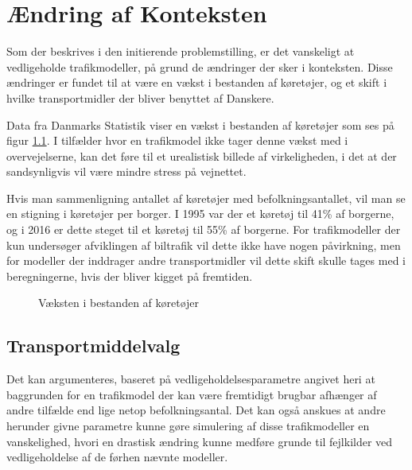 \chapter{Ændring af Konteksten}
Som der beskrives i den initierende problemstilling, er det vanskeligt at vedligeholde trafikmodeller, på grund de ændringer der sker i konteksten. Disse ændringer er fundet til at være en vækst i bestanden af køretøjer, og et skift i hvilke transportmidler der bliver benyttet af Danskere.

\vspace{5mm}

Data fra Danmarks Statistik viser en vækst i bestanden af køretøjer som ses på figur \ref{plotvaekstbiler}. I tilfælder hvor en trafikmodel ikke tager denne vækst med i overvejelserne, kan det føre til et urealistisk billede af virkeligheden, i det at der sandsynligvis vil være mindre stress på vejnettet.

\vspace{5mm}

Hvis man sammenligning antallet af køretøjer med befolkningsantallet, vil man se en stigning i køretøjer per borger. I 1995 var der et køretøj til 41\% af borgerne, og i 2016 er dette steget til et køretøj til 55\% af borgerne. For trafikmodeller der kun undersøger afviklingen af biltrafik vil dette ikke have nogen påvirkning, men for modeller der inddrager andre transportmidler vil dette skift skulle tages med i beregningerne, hvis der bliver kigget på fremtiden.

\begin{figure}[h!]
    
    \caption{Væksten i bestanden af køretøjer}
    \label{plotvaekstbiler}
\end{figure}


\section{Transportmiddelvalg}
Det kan argumenteres, baseret på vedligeholdelsesparametre angivet heri at baggrunden for en trafikmodel der kan være fremtidigt brugbar afhænger af andre tilfælde end lige netop befolkningsantal. Det kan også anskues at andre herunder givne parametre kunne gøre simulering af disse trafikmodeller en vanskelighed, hvori en drastisk ændring kunne medføre grunde til fejlkilder ved vedligeholdelse af de førhen nævnte modeller.

